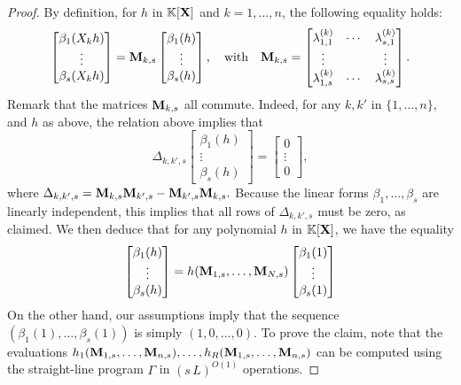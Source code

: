 \documentclass[11pt]{article}
\numberwithin{Property}{section}
\numberwithin{Theorem}{section}
\numberwithin{Proposition}{section}
\numberwithin{Lemma}{section}
\numberwithin{Corollary}{section}
\numberwithin{Definition}{section}
\numberwithin{Remark}{section}
\numberwithin{Conjecture}{section}
\numberwithin{Problem}{section}
\numberwithin{Claim}{section}
\theoremstyle{definition}
\numberwithin{Example}{section}
\newcommand{\field}{\mathbb{K}} %
\newcommand{\mat}[1]{\mathbf{\MakeUppercase{#1}}} %
\begin{document}
\begin{proof}
By definition, for $h$ in $\field[\mat{X}]$  and $k=1,\dots,n$, the following equality holds:
\[
 \begin{bmatrix}
    \beta_1(X_k h)\\
    \vdots\\
    \beta_s(X_k h)
  \end{bmatrix}=
\mat{M}_{k,s}
  \begin{bmatrix}
    \beta_1(h)\\
    \vdots\\
    \beta_s(h)
  \end{bmatrix},
\quad\text{with}\quad
\mat{M}_{k,s}= \begin{bmatrix}
    \lambda^{(k)}_{1,1} & \cdots & \lambda^{(k)}_{s,1}\\
    \vdots && \vdots \\
    \lambda^{(k)}_{1,s} & \cdots & \lambda^{(k)}_{s,s}
  \end{bmatrix}.
\]
Remark that the matrices $\mat{M}_{k,s}$ all commute. Indeed, for any $k,k'$ in $\{1,\dots,n\}$, and $h$ as above, the relation above implies that 
\[
\Delta_{k,k',s}
  \begin{bmatrix}
    \beta_1(h)\\
    \vdots\\
    \beta_s(h)
  \end{bmatrix} =
  \begin{bmatrix}
0\\ \vdots \\ 0 
  \end{bmatrix},
\] where $\Delta_{k,k',s} = \mat{M}_{k,s}\mat{M}_{k',s}-\mat{M}_{k',s}\mat{M}_{k,s}.$ Because the linear forms $\beta_1,\dots,\beta_s$ are linearly independent, this implies that all rows of $\Delta_{k,k',s}$ must be zero, as claimed. We then deduce that for any polynomial $h$ in $\field[\mat{X}]$, we have the equality
\[ \begin{bmatrix}
    \beta_1(h)\\
    \vdots\\
    \beta_s(h)
  \end{bmatrix} =
h(\mat{M}_{1,s},\dots,\mat{M}_{N,s})   \begin{bmatrix}
    \beta_1(1)\\
    \vdots\\
    \beta_s(1)
  \end{bmatrix} \]
On the other hand, our assumptions imply that the sequence $(\beta_1(1),\dots,\beta_s(1))$ is simply $(1,0,\dots,0)$. To prove the claim, note that the evaluations $h_1(\mat{M}_{1,s},\dots,\mat{M}_{n,s}),\dots,h_R(\mat{M}_{1,s},\dots,\mat{M}_{n,s})$ can be computed using the straight-line program $\Gamma$ in $(s\,L)^{O(1)}$ operations.
\end{proof}
\end{document}
